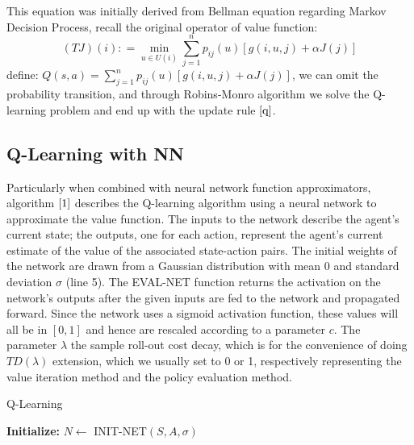 \documentclass{article}
\begin{document}
This equation was initially derived from Bellman equation regarding Markov Decision Process, recall the original operator of value function:
\begin{equation}
  (TJ)(i) : = \min_{u \in U(i)} \sum_{j=1}^{n} p_{ij}(u)[g(i,u,j)+ \alpha J(j)]
\end{equation} 
define: $Q(s,a) = \sum_{j=1}^{n} p_{ij}(u)[g(i,u,j)+ \alpha J(j)]$, we can omit the probability transition, and through Robins-Monro algorithm
we solve the Q-learning problem and end up with the update rule $\ref{q}$.

 
 \subsection{Q-Learning with NN}

 Particularly when combined with neural network function approximators, 
 algorithm $\ref{1}$ describes the Q-learning algorithm using a neural network to approximate the value function. The inputs to the network describe the agent’s current state; the outputs,
  one for each action, represent the agent’s current estimate of the value of the associated state-action pairs. 
  The initial weights of the network are drawn from a Gaussian distribution with mean $0$ and standard deviation $\sigma$ (line 5). 
 The EVAL-NET function returns the activation on the network’s outputs after the given inputs are fed to the network and propagated forward. Since the network uses a sigmoid activation function,
  these values will all be in $[0,1]$ and hence are rescaled according to a parameter $c$. The parameter $\lambda$ the sample roll-out cost decay, which is for the convenience of
  doing $TD(\lambda)$ extension, which we usually set to 0 or 1, respectively representing the value iteration method and the policy evaluation method.

   \begin{algorithm}[H] 
     \caption{Q-Learning}
     \label{1}
     \textbf{Initialize:} $N \leftarrow$ INIT-NET$(S,A,\sigma)$ \;    
     \end{algorithm}
\end{document}
